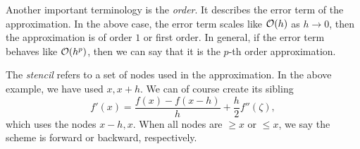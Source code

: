 Another important terminology is the \emph{order}. It describes the error term of the approximation. In the above case, the error term scales like $\mathcal O(h)$ as $h\to 0$, then the approximation is of order $1$ or first order. In general, if the error term behaves like $\mathcal O(h^p)$, then we can say that it is the $p$-th order approximation. 

The \emph{stencil} refers to a set of nodes used in the approximation. In the above example, we have used $x, x+h$. We can of course create its sibling
\begin{equation}
    f'(x) = \frac{f(x) - f(x - h)}{h} + \frac{h}{2} f''(\zeta),
\end{equation}
which uses the nodes $x-h, x$. When all nodes are $\ge x$ or $\le x$, we say the scheme is forward or backward, respectively.

